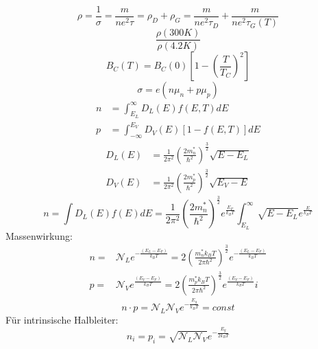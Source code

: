 \documentclass[11pt]{article}
\begin{document}
\begin{equation}
  \rho=\frac{1}{\sigma}=\frac{m}{ne^2\tau}=\rho_D+\rho_G=\frac{m}{ne^2\tau_D}+
  \frac{m}{ne^2\tau_G(T)}
\end{equation}
\begin{equation}
  \frac{\rho(300K)}{\rho(4.2K)}
\end{equation}
\begin{equation}
  B_C(T)=B_C(0)\left[1-\left(\frac{T}{T_C}\right)^2\right]
\end{equation}
\begin{equation}
  \sigma=e(n\mu_n+p\mu_p)
\end{equation}
\begin{equation}
  \begin{align}
    n&=\int_{E_L}^{\infty}D_L(E)f(E,T)dE\\
    p&=\int_{-\infty}^{E_V}D_V(E)[1-f(E,T)]dE
  \end{align}
\end{equation}
\begin{equation}
  \begin{align}
    D_L(E)&=\frac{1}{2\pi^2}\left(\frac{2m_n^*}{\hbar^2}\right)^{\frac{3}{2}}
    \sqrt{E-E_L}\\
    D_V(E)&=\frac{1}{2\pi^2}\left(\frac{2m_p^*}{\hbar^2}\right)^{\frac{3}{2}}
    \sqrt{E_V-E}
  \end{align}
\end{equation}
\begin{equation}
  n=\int D_L(E)f(E)dE=\frac{1}{2\pi^2}\left(\frac{2m_n^*}{\hbar^2}\right)^
  {\frac{3}{2}}e^{\frac{E_F}{k_BT}}\int_{E_L}^{\infty}\sqrt{E-E_L}
  e^{\frac{E}{k_BT}}
\end{equation}
Massenwirkung:
\begin{equation}\label{massenwirkung}
  \begin{align}
    n=&\mathcal{N}_Le^{-\frac{(E_L-E_F)}{k_BT}}=
    2\left(\frac{m_n^*k_BT}{2\pi\hbar^2}\right)^{\frac{3}{2}}
    e^{-\frac{(E_L-E_F)}{k_BT}}\\
    p=&\mathcal{N}_Ve^{\frac{(E_V-E_F)}{k_BT}}=
    2\left(\frac{m_p^*k_BT}{2\pi\hbar^2}\right)^{\frac{3}{2}}
    e^{\frac{(E_V-E_F)}{k_BT}}i
  \end{align}
\end{equation}
\begin{equation}
  n\cdot p=\mathcal{N}_L\mathcal{N}_Ve^{-\frac{E_g}{k_BT}}=const
\end{equation}
Für intrinsische Halbleiter:
\begin{equation}
  n_i=p_i=\sqrt{\mathcal{N}_L\mathcal{N}_V}e^{-\frac{E_g}{2k_BT}}
\end{equation}
\end{document}
